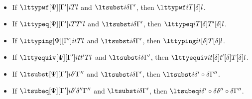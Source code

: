 \begin{lemma}$ $
  \begin{itemize}
  \item If $\lttypwf[\Psi][\Gamma']i T l$ and $\ltsubst i{\delta}{\Gamma'}$, then
    $\lttypwf i{T[\delta]} l$.
  \item If $\lttypeq[\Psi][\Gamma']i T{T'} l$ and $\ltsubst i{\delta}{\Gamma'}$, then
    $\lttypeq i{T[\delta]}{T'[\delta]} l$.
  \item If $\lttyping[\Psi][\Gamma']i t T l$ and $\ltsubst i{\delta}{\Gamma'}$, then
    $\lttyping i{t[\delta]}{T[\delta]} l$.
  \item If $\lttyequiv[\Psi][\Gamma']i t{t'} T l$ and $\ltsubst i{\delta}{\Gamma'}$, then
    $\lttyequiv i{t[\delta]}{t'[\delta]}{T[\delta]} l$.
  \item If $\ltsubst[\Psi][\Gamma'] i{\delta'}{\Gamma''}$ and $\ltsubst i{\delta}{\Gamma'}$, then
    $\ltsubst i{\delta' \circ \delta}{\Gamma''}$.
  \item If $\ltsubeq[\Psi][\Gamma'] i{\delta'}{\delta''}{\Gamma''}$ and $\ltsubst i{\delta}{\Gamma'}$, then
    $\ltsubeq i{\delta' \circ \delta}{\delta'' \circ \delta}{\Gamma''}$.
  \end{itemize}
\end{lemma}
